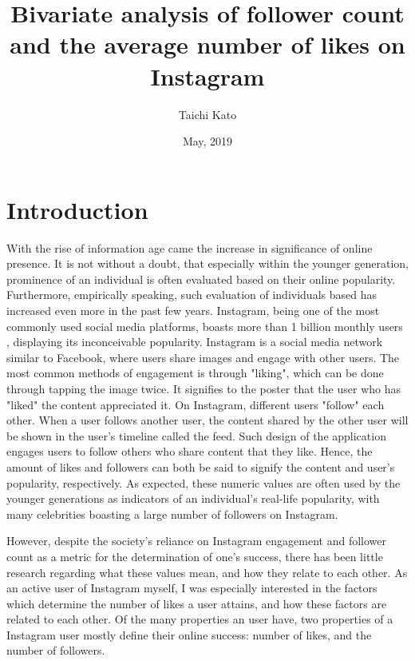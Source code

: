 \documentclass[11pt]{article}
\title{Bivariate analysis of follower count and the average number of likes on Instagram}
\author{Taichi Kato}
\date{May, 2019}
\begin{document}
\maketitle

\begin{abstract}
\textit{
}
\end{abstract}

\section{Introduction}\label{section-introduction}

With the rise of information age came the increase in significance of online presence. 
It is not without a doubt, that especially within the younger generation, prominence of an individual is often evaluated based on their online popularity. 
Furthermore, empirically speaking, such evaluation of individuals based has increased even more in the past few years.
Instagram, being one of the most commonly used social media platforms, boasts more than 1 billion monthly users \cite{techcrunch:online}, displaying its inconceivable popularity.
Instagram is a social media network similar to Facebook, where users share images and engage with other users.
The most common methods of engagement is through "liking", which can be done through tapping the image twice.
It signifies to the poster that the user who has "liked" the content appreciated it.
On Instagram, different users "follow" each other.
When a user follows another user, the content shared by the other user will be shown in the user's timeline called the feed.
Such design of the application engages users to follow others who share content that they like.
Hence, the amount of likes and followers can both be said to signify the content and user's popularity, respectively.
As expected, these numeric values are often used by the younger generations as indicators of an individual's real-life popularity, with many celebrities boasting a large number of followers on Instagram.

However, despite the society's reliance on Instagram engagement and follower count as a metric for the determination of one's success, there has been little research regarding what these values mean, and how they relate to each other.
As an active user of Instagram myself, I was especially interested in the factors which determine the number of likes a user attains, and how these factors are related to each other.
Of the many properties an user have, two properties of a Instagram user mostly define their online success: number of likes, and the number of followers.
\end{document}

